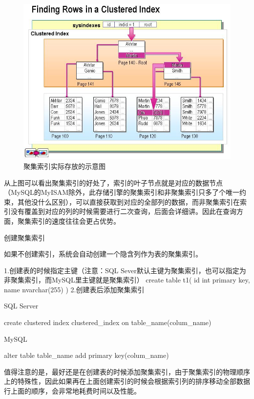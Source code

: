 \documentclass[UTF8]{ctexart}
\begin{document}
\begin{figure}[htbp]
\centering
\includegraphics[height=1\linewidth,width=1\textwidth]{Figure/index0.png}
\caption{聚集索引实际存放的示意图}
\end{figure}
从上图可以看出聚集索引的好处了，索引的叶子节点就是对应的数据节点（MySQL的MyISAM除外，此存储引擎的聚集索引和非聚集索引只多了个唯一约束，其他没什么区别），可以直接获取到对应的全部列的数据，而非聚集索引在索引没有覆盖到对应的列的时候需要进行二次查询，后面会详细讲。因此在查询方面，聚集索引的速度往往会更占优势。

创建聚集索引

如果不创建索引，系统会自动创建一个隐含列作为表的聚集索引。

1.创建表的时候指定主键（注意：SQL Sever默认主键为聚集索引，也可以指定为非聚集索引，而MySQL里主键就是聚集索引）
create table t1(
    id int primary key,
    name nvarchar(255)
)
2.创建表后添加聚集索引

SQL Server

create clustered index clustered\_index on table\_name(colum\_name)

MySQL

alter table table\_name add primary key(colum\_name)

值得注意的是，最好还是在创建表的时候添加聚集索引，由于聚集索引的物理顺序上的特殊性，因此如果再在上面创建索引的时候会根据索引列的排序移动全部数据行上面的顺序，会非常地耗费时间以及性能。
\end{document}
